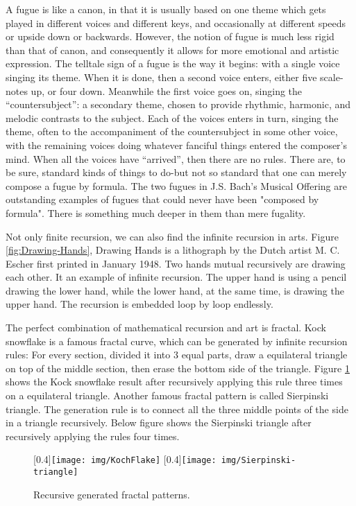 \documentclass[b5paper]{article}
\begin{document}
A fugue is like a canon, in that it is usually based on one theme which gets played in different voices and different keys, and occasionally at different speeds or upside down or backwards. However, the notion of fugue is much less rigid than that of canon, and consequently it allows for more emotional and artistic expression. The telltale sign of a fugue is the way it begins: with a single voice singing its theme. When it is done, then a second voice enters, either five scale-notes up, or four down. Meanwhile the first voice goes on, singing the ``countersubject'': a secondary theme, chosen to provide rhythmic, harmonic, and melodic contrasts to the subject. Each of the voices enters in turn, singing the theme, often to the accompaniment of the countersubject in some other voice, with the remaining voices doing whatever fanciful things entered the composer's mind. When all the voices have ``arrived'', then there are no rules. There are, to be sure, standard kinds of things to do-but not so standard that one can merely compose a fugue by formula. The two fugues in J.S. Bach's Musical Offering are outstanding examples of fugues that could never have been "composed by formula". There is something much deeper in them than mere fugality\cite{GEB}.

Not only finite recursion, we can also find the infinite recursion in arts. Figure \ref{fig:Drawing-Hands}, Drawing Hands is a lithograph by the Dutch artist M. C. Escher first printed in January 1948. Two hands mutual recursively are drawing each other. It an example of infinite recursion. The upper hand is using a pencil drawing the lower hand, while the lower hand, at the same time, is drawing the upper hand. The recursion is embedded loop by loop endlessly.

The perfect combination of mathematical recursion and art is fractal. Kock snowflake is a famous fractal curve, which can be generated by infinite recursion rules: For every section, divided it into 3 equal parts, draw a equilateral triangle on top of the middle section, then erase the bottom side of the triangle. Figure \ref{fig:fractal} shows the Kock snowflake result after recursively applying this rule three times on a equilateral triangle. Another famous fractal pattern is called Sierpinski triangle. The generation rule is to connect all the three middle points of the side in a triangle recursively. Below figure shows the Sierpinski triangle after recursively applying the rules four times.

\begin{figure}[htbp]
 \centering
 [0.4\linewidth]{\texttt{[image: img/KochFlake]}}
 [0.4\linewidth]{\texttt{[image: img/Sierpinski-triangle]}}
 \caption{Recursive generated fractal patterns.}
 \label{fig:fractal}
\end{figure}
\end{document}
